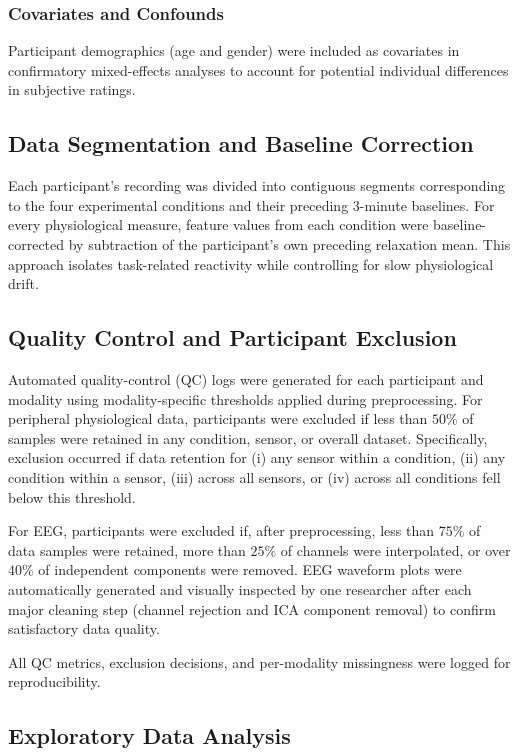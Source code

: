 \documentclass[lettersize,journal]{IEEEtran}
\begin{document}
\subsubsection{Covariates and Confounds}
Participant demographics (age and gender) were included as covariates in confirmatory mixed-effects analyses to account for potential individual differences in subjective ratings. 


\subsection{Data Segmentation and Baseline Correction}
Each participant’s recording was divided into contiguous segments corresponding to the four experimental conditions and their preceding 3-minute baselines. For every physiological measure, feature values from each condition were baseline-corrected by subtraction of the participant’s own preceding relaxation mean. This approach isolates task-related reactivity while controlling for slow physiological drift.

\subsection{Quality Control and Participant Exclusion}
\label{sec:qc}

Automated quality-control (QC) logs were generated for each participant and modality using modality-specific thresholds applied during preprocessing. For peripheral physiological data, participants were excluded if less than $50\%$ of samples were retained in any condition, sensor, or overall dataset. Specifically, exclusion occurred if data retention for (i) any sensor within a condition, (ii) any condition within a sensor, (iii) across all sensors, or (iv) across all conditions fell below this threshold.

For EEG, participants were excluded if, after preprocessing, less than $75\%$ of data samples were retained, more than $25\%$ of channels were interpolated, or over $40\%$ of independent components were removed. EEG waveform plots were automatically generated and visually inspected by one researcher after each major cleaning step (channel rejection and ICA component removal) to confirm satisfactory data quality.

All QC metrics, exclusion decisions, and per-modality missingness were logged for reproducibility.

\subsection{Exploratory Data Analysis}
\end{document}
